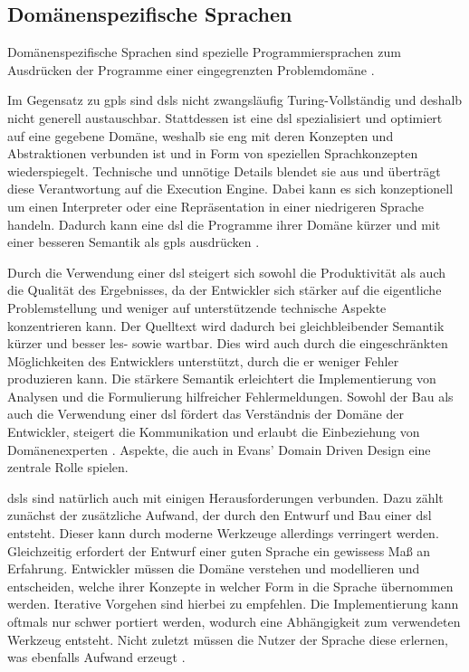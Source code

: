 \subsection{Domänenspezifische Sprachen}
    Domänenspezifische Sprachen
    sind spezielle Programmiersprachen zum Ausdrücken der Programme einer eingegrenzten
    Problemdomäne \cite[Kapitel 2.2]{voelter:DslEngineering}.

    Im Gegensatz zu \glspl{gpl} sind \glspl{dsl} nicht zwangsläufig Turing-Vollständig
    und deshalb nicht generell austauschbar.
    Stattdessen ist eine \gls{dsl} spezialisiert und optimiert auf eine gegebene Domäne,
    weshalb sie eng mit deren Konzepten und Abstraktionen verbunden ist
    und in Form von speziellen Sprachkonzepten wiederspiegelt.
    Technische und unnötige Details blendet sie aus und überträgt diese Verantwortung
    auf die Execution Engine.
    Dabei kann es sich konzeptionell um einen Interpreter oder eine Repräsentation in einer
    niedrigeren Sprache handeln.
    Dadurch kann eine \gls{dsl} die Programme ihrer Domäne kürzer und mit einer besseren Semantik
    als \glspl{gpl} ausdrücken \cite[Kapitel 2.2]{voelter:DslEngineering}.

    Durch die Verwendung einer \gls{dsl} steigert sich sowohl die Produktivität
    als auch die Qualität des Ergebnisses,
    da der Entwickler sich stärker auf die eigentliche Problemstellung und weniger
    auf unterstützende technische Aspekte konzentrieren kann.
    Der Quelltext wird dadurch bei gleichbleibender Semantik kürzer und besser les- sowie wartbar.
    Dies wird auch durch die eingeschränkten Möglichkeiten des Entwicklers unterstützt,
    durch die er weniger Fehler produzieren kann.
    Die stärkere Semantik erleichtert die Implementierung von Analysen und die Formulierung
    hilfreicher Fehlermeldungen.
    Sowohl der Bau als auch die Verwendung einer \gls{dsl} fördert das Verständnis der Domäne
    der Entwickler, steigert die Kommunikation und erlaubt die Einbeziehung von Domänenexperten
    \cite[Kapitel 2.5]{voelter:DslEngineering}.
    Aspekte, die auch in Evans' \cite{evans:DomainDrivenDesign} Domain Driven Design eine zentrale Rolle spielen.


    \glspl{dsl} sind natürlich auch mit einigen Herausforderungen verbunden.
    Dazu zählt zunächst der zusätzliche Aufwand, der durch den Entwurf und Bau einer \gls{dsl} entsteht.
    Dieser kann durch moderne Werkzeuge allerdings verringert werden.
    Gleichzeitig erfordert der Entwurf einer guten Sprache ein gewissess Maß an Erfahrung.
    Entwickler müssen die Domäne verstehen und modellieren und entscheiden,
    welche ihrer Konzepte in welcher Form in die Sprache übernommen werden.
    Iterative Vorgehen sind hierbei zu empfehlen.
    Die Implementierung kann oftmals nur schwer portiert werden,
    wodurch eine Abhängigkeit zum verwendeten Werkzeug entsteht.
    Nicht zuletzt müssen die Nutzer der Sprache diese erlernen,
    was ebenfalls Aufwand erzeugt
    \cite[Kapitel 2.6]{voelter:DslEngineering}.


